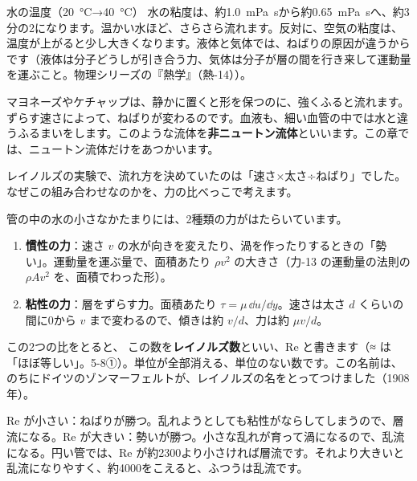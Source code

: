 \begin{phbaisuru}{水の温度（\qty{20}{\celsius}→\qty{40}{\celsius}）}
水の粘度は、約\qty{1.0}{mPa.s}から約\qty{0.65}{mPa.s}へ、約3分の2になります。温かい水ほど、さらさら流れます。反対に、空気の粘度は、温度が上がると少し大きくなります。液体と気体では、ねばりの原因が違うからです（液体は分子どうしが引き合う力、気体は分子が層の間を行き来して運動量を運ぶこと。物理シリーズの『熱学』（熱-14））。
\end{phbaisuru}

\begin{motto}[4]
マヨネーズやケチャップは、静かに置くと形を保つのに、強くふると流れます。ずらす速さによって、ねばりが変わるのです。血液も、細い血管の中では水と違うふるまいをします。このような流体を\textbf{非ニュートン流体}といいます。この章では、ニュートン流体だけをあつかいます。
\end{motto}

\label{ph:力-14:sec7}レイノルズの実験で、流れ方を決めていたのは「速さ×太さ÷ねばり」でした。なぜこの組み合わせなのかを、力の比べっこで考えます。

管の中の水の小さなかたまりには、2種類の力がはたらいています。

\begin{enumerate}[label={\bkcircled{\arabic*}}, leftmargin=2.4\zw, itemsep=2pt, topsep=2pt]
\item \textbf{慣性の力}：速さ $v$ の水が向きを変えたり、渦を作ったりするときの「勢い」。運動量を運ぶ量で、面積あたり $\rho v^2$ の大きさ（力-13 の運動量の法則の $\rho Av^2$ を、面積でわった形）。
\item \textbf{粘性の力}：層をずらす力。面積あたり $\tau=\mu\,\dd u/\dd y$。速さは太さ $d$ くらいの間に0から $v$ まで変わるので、傾きは約 $v/d$、力は約 $\mu v/d$。
\end{enumerate}
\label{ph:力-14:re}この2つの比をとると、
\noindent この数を\textbf{レイノルズ数}といい、Re と書きます（≈ は「ほぼ等しい」。5-8①）。単位が全部消える、単位のない数です。この名前は、のちにドイツのゾンマーフェルトが、レイノルズの名をとってつけました（1908年）。

\begin{phyomi}[$\mathrm{Re}=vd/\nu$]
Re が小さい：ねばりが勝つ。乱れようとしても粘性がならしてしまうので、層流になる。Re が大きい：勢いが勝つ。小さな乱れが育って渦になるので、乱流になる。円い管では、Re が約2300より小さければ層流です。それより大きいと乱流になりやすく、約4000をこえると、ふつうは乱流です。
\end{phyomi}

